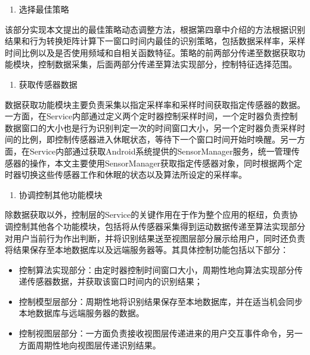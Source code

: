 \begin{enumerate}[(1)]
	\item 选择最佳策略
\end{enumerate}
\par 该部分实现本文提出的最佳策略动态调整方法，根据第四章中介绍的方法根据识别结果和行为转换矩阵计算下一窗口时间内最佳的识别策略，包括数据采样率，采样时间比例以及是否使用频域和自相关函数特征。策略的前两部分传递至数据获取功能模块，控制数据采集，后面两部分传递至算法实现部分，控制特征选择范围。
\begin{enumerate}[(２)]
	\item 获取传感器数据
\end{enumerate}
\par 数据获取功能模块主要负责采集以指定采样率和采样时间获取指定传感器的数据。一方面，在Service内部通过定义两个定时器控制采样时间，一个定时器负责控制数据窗口的大小也是行为识别判定一次的时间窗口大小，另一个定时器负责采样时间的比例，即控制传感器进入休眠状态，等待下一个窗口时间开始时唤醒。另一方面，在Service内部通过获取Android系统提供的SensorManager服务，统一管理传感器的操作，本文主要使用SensorManager获取指定传感器对象，同时根据两个定时器切换这些传感器工作和休眠的状态以及算法所设定的采样率。
\begin{enumerate}[(2)]
	\item 协调控制其他功能模块
\end{enumerate}
\par 除数据获取以外，控制层的Service的关键作用在于作为整个应用的枢纽，负责协调控制其他各个功能模块，包括将从传感器采集得到运动数据传递至算法实现部分对用户当前行为作出判断，并将识别结果送至视图层部分展示给用户，同时还负责将结果保存至本地数据库以及远端服务器等。其具体控制功能包括以下部分：
\begin{itemize}
	\item 控制算法实现部分：由定时器控制时间窗口大小，周期性地向算法实现部分传递传感器数据，并获取该窗口时间内的识别结果；
	\item 控制模型层部分：周期性地将识别结果保存至本地数据库，并在适当机会同步本地数据库与远端服务器的数据。
	\item 控制视图层部分：一方面负责接收视图层传递进来的用户交互事件命令，另一方面周期性地向视图层传递识别结果。
\end{itemize}

